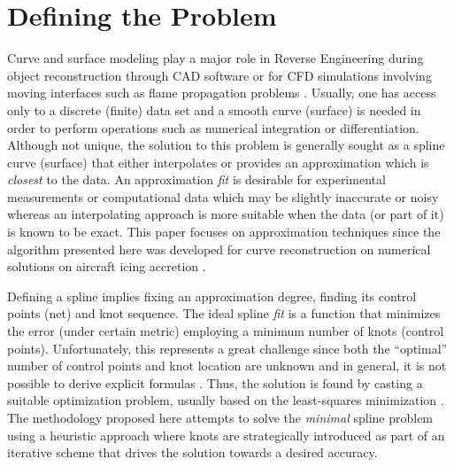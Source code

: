 \documentclass[a4paper,12pt]{article}
\author{Julia Docampo}
\begin{document}
 
 
 \section{Defining the Problem}
 Curve and surface modeling play a major role in Reverse Engineering during object reconstruction
  through CAD software \cite{Ma1998, sarkar1991} or for CFD simulations involving moving
  interfaces such as flame propagation problems \cite{malladi1995}. 
  Usually, one has access only to a discrete (finite) data set 
  and a smooth curve (surface) is needed in order to perform operations such as numerical integration or differentiation. 
  Although not unique, the solution to this problem is generally sought as a spline curve (surface)  
  that either interpolates or provides an approximation which is \emph{closest} to the data.  
   An approximation \emph{fit} is desirable for experimental measurements or computational data 
   which may be slightly inaccurate or noisy whereas an interpolating approach \cite{piegl1999,ma1995} 
   is more suitable when
   the data (or part of it) is known to be exact. This paper focuses on 
   approximation techniques since the algorithm presented here was developed for 
    curve reconstruction on numerical solutions on aircraft icing accretion \cite{}. 
    
    Defining a spline implies fixing an approximation degree, 
    finding its control points (net) and knot sequence.  The ideal spline \emph{fit} is a function 
     that minimizes the error (under certain metric) employing a minimum number 
     of knots (control points).  Unfortunately, this represents a great challenge since both the ``optimal'' number of control points 
  and knot location are unknown and in general, it is not possible to derive explicit formulas \cite{jupp1978}.  
  Thus, the solution is found by casting a suitable optimization problem, 
  usually based on the least-squares minimization \cite{nurbs_book, deboor2001practical, schumaker2015spline}. 
   The methodology proposed here attempts to solve the \emph{minimal} spline problem 
    using a heuristic approach where knots are strategically introduced 
   as part of an iterative scheme that drives the solution towards a desired accuracy. 
      
\end{document}
